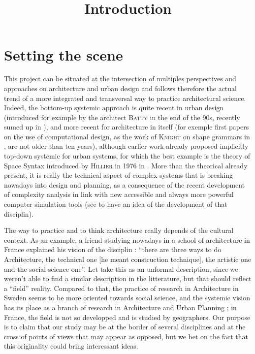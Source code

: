 \documentclass[english]{article}
\date{}
\newcommand{\noun}[1]{\textsc{#1}}
\begin{document}
\title{Introduction}

\maketitle

\section{Setting the scene}

This project can be situated at the intersection of multiples perspectives
and approaches on architecture and urban design and follows therefore
the actual trend of a more integrated and transversal way to practice
architectural science. Indeed, the bottom-up systemic approach is
quite recent in urban design (introduced for example by the architect
\noun{Batty} in the end of the 90s, recently sumed up in \cite{Bat07}),
and more recent for architecture in itself (for exemple first papers
on the use of computational design, as the work of \noun{Knight} on
shape grammars in \cite{knight2003computing}, are not older than
ten years), although earlier work already proposed implicitly top-down
systemic for urban systems, for which the best example is the theory
of Space Syntax introduced by \noun{Hillier} in 1976 in \cite{hillier1976space}.
More than the theorical already present, it is really the technical
aspect of complex systems that is breaking nowadays into design and
planning, as a consequence of the recent development of complexity
analysis in link with new accessible and always more powerful computer
simulation tools (see \cite{chavalarias2009french} to have an idea
of the development of that disciplin).

\bigskip{}


The way to practice and to think architecture really depends of the
cultural context. As an example, a friend studying nowadays in a school
of architecture in France explained his vision of the disciplin :
``there are three ways to do Architecture, the technical one {[}he
meant construction technique{]}, the artistic one and the social science
one''. Let take this as an unformal description, since we weren't
able to find a similar description in the litterature, but that should
reflect a ``field'' reality. Compared to that, the practice of research
in Architecture in Sweden seems to be more oriented towards social
science, and the systemic vision has its place as a branch of research
in Architecture and Urban Planning ; in France, the field is not so
developped and is studied by geographers. Our purpose is to claim
that our study may be at the border of several disciplines and at
the cross of points of views that may appear as opposed, but we bet
on the fact that this originality could bring interessant ideas.
\end{document}
